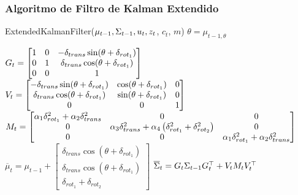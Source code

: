 \begin{frame}
	\frametitle{Algoritmo de Filtro de Kalman Extendido}
	
 	\begin{algorithmic}[1]
		\State ExtendedKalmanFilter({$\mu_{t-1}, \Sigma_{t-1}, u_{t}, z_{t}$, $c_{t}$, $m$})
		\State $\theta = \mu_{t-1,\theta}$
		
		\State $
			G_{t} = 
			\begin{bmatrix}
				1 & 0 & -\delta_{trans} \sin(\theta + \delta_{rot_{1}})\\
				0 & 1 & \delta_{trans} \cos(\theta + \delta_{rot_{1}})\\
				0 & 0 & 1\\
			\end{bmatrix}
			   $
		\State $
			V_{t} = 
			\begin{bmatrix}
				-\delta_{trans} \sin(\theta + \delta_{rot_{1}}) & \cos(\theta + \delta_{rot_{1}}) & 0\\
				\delta_{trans} \cos(\theta + \delta_{rot_{1}}) & \sin(\theta + \delta_{rot_{1}}) & 0\\
				0 & 0 & 1\\
			\end{bmatrix}
         	   $
		\State $
			M_{t} = 
			\begin{bmatrix}
				\alpha_{1}\delta^{2}_{rot_{1}} + \alpha_{2}\delta^{2}_{trans} & 0 & 0\\
				0 & \alpha_{3} \delta^{2}_{trans} + \alpha_{4} \left( \delta^{2}_{rot_{1}} + \delta^{2}_{rot_{2}} \right) & 0\\
				0 & 0 & \alpha_{1}\delta^{2}_{rot_{1}} + \alpha_{2}\delta^{2}_{trans}\\
			\end{bmatrix}
			  $
		\State $\overline{\mu}_{t} = \mu_{t-1} + 
			\begin{bmatrix}
			\delta_{trans}\cos(\theta+\delta_{rot_{1}}) \\
			\delta_{trans}\cos(\theta+\delta_{rot_{1}}) \\
			\delta_{rot_{1}} + \delta_{rot_{2}}
		\end{bmatrix}$
		\State $\overline{\Sigma}_{t} = G_{t} \Sigma_{t-1} G_{t}^{\top}+V_{t} M_{t} V_{t}^{\top}$
	\end{algorithmic}
	
\end{frame}

